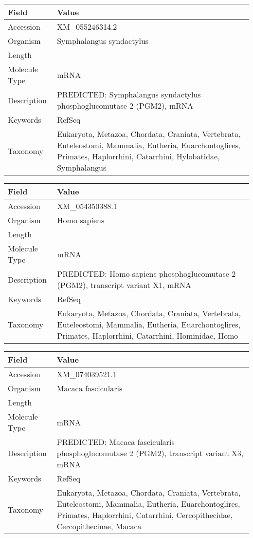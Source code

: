 \documentclass[10pt]{article}
\begin{document}
\vspace{1em}
{\footnotesize
\begin{longtable}{>{\raggedright\arraybackslash}p{4.5cm} >{\raggedright\arraybackslash}p{11.5cm}}
\textbf{Field} & \textbf{Value} \\
\hline
Accession & XM\_055246314.2 \\
Organism & Symphalangus syndactylus \\
Length & 2975 \\
Molecule Type & mRNA \\
Description & PREDICTED: Symphalangus syndactylus phosphoglucomutase 2 (PGM2), mRNA \\
Keywords & RefSeq \\
Taxonomy & Eukaryota, Metazoa, Chordata, Craniata, Vertebrata, Euteleostomi, Mammalia, Eutheria, Euarchontoglires, Primates, Haplorrhini, Catarrhini, Hylobatidae, Symphalangus \\
\end{longtable}
}

\vspace{1em}
{\footnotesize
\begin{longtable}{>{\raggedright\arraybackslash}p{4.5cm} >{\raggedright\arraybackslash}p{11.5cm}}
\textbf{Field} & \textbf{Value} \\
\hline
Accession & XM\_054350388.1 \\
Organism & Homo sapiens \\
Length & 2834 \\
Molecule Type & mRNA \\
Description & PREDICTED: Homo sapiens phosphoglucomutase 2 (PGM2), transcript variant X1, mRNA \\
Keywords & RefSeq \\
Taxonomy & Eukaryota, Metazoa, Chordata, Craniata, Vertebrata, Euteleostomi, Mammalia, Eutheria, Euarchontoglires, Primates, Haplorrhini, Catarrhini, Hominidae, Homo \\
\end{longtable}
}

\vspace{1em}
{\footnotesize
\begin{longtable}{>{\raggedright\arraybackslash}p{4.5cm} >{\raggedright\arraybackslash}p{11.5cm}}
\textbf{Field} & \textbf{Value} \\
\hline
Accession & XM\_074039521.1 \\
Organism & Macaca fascicularis \\
Length & 2274 \\
Molecule Type & mRNA \\
Description & PREDICTED: Macaca fascicularis phosphoglucomutase 2 (PGM2), transcript variant X3, mRNA \\
Keywords & RefSeq \\
Taxonomy & Eukaryota, Metazoa, Chordata, Craniata, Vertebrata, Euteleostomi, Mammalia, Eutheria, Euarchontoglires, Primates, Haplorrhini, Catarrhini, Cercopithecidae, Cercopithecinae, Macaca \\
\end{longtable}
}
\end{document}
